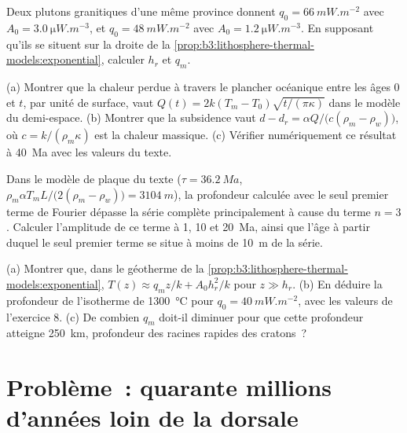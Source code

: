 \begin{exercise}[$\star\star$]\label{exo:b3:lithosphere-thermal-models:9}
Deux plutons granitiques d'une même province donnent $q_0 = \qty{66}{mW.m^{-2}}$ avec $A_0
= \qty{3.0}{\micro W.m^{-3}}$, et $q_0 = \qty{48}{mW.m^{-2}}$ avec $A_0 =
\qty{1.2}{\micro W.m^{-3}}$. En supposant qu'ils se situent sur la droite de la
\cref{prop:b3:lithosphere-thermal-models:exponential}, calculer $h_r$ et $q_m$.
\end{exercise}

\begin{exercise}[$\star\star\star$]\label{exo:b3:lithosphere-thermal-models:10}
(a) Montrer que la chaleur perdue à travers le plancher océanique entre les âges 0 et $t$, par
unité de surface, vaut $Q(t) = 2k(T_m - T_0)\sqrt{t/(\pi\kappa)}$ dans le modèle du
demi-espace. (b) Montrer que la subsidence vaut $d - d_r = \alpha Q/\bigl(c(\rho_m -
\rho_w)\bigr)$, où $c = k/(\rho_m\kappa)$ est la chaleur massique. (c) Vérifier
numériquement ce résultat à \qty{40}{Ma} avec les valeurs du texte.
\end{exercise}

\begin{exercise}[$\star\star\star$]\label{exo:b3:lithosphere-thermal-models:11}
Dans le modèle de plaque du texte ($\tau = \qty{36.2}{Ma}$, $\rho_m\alpha T_mL/
\bigl(2(\rho_m - \rho_w)\bigr) = \qty{3104}{m}$), la profondeur calculée avec le seul
premier terme de Fourier dépasse la série complète principalement à cause du terme $n = 3$.
Calculer l'amplitude de ce terme à 1, 10 et \qty{20}{Ma}, ainsi que l'âge à partir duquel
le seul premier terme se situe à moins de \qty{10}{m} de la série.
\end{exercise}

\begin{exercise}[$\star\star\star$]\label{exo:b3:lithosphere-thermal-models:12}
(a) Montrer que, dans le géotherme de la \cref{prop:b3:lithosphere-thermal-models:exponential},
$T(z) \approx q_mz/k + A_0h_r^2/k$ pour $z \gg h_r$. (b) En déduire la profondeur de
l'isotherme de \qty{1300}{\celsius} pour $q_0 = \qty{40}{mW.m^{-2}}$, avec les valeurs
de l'exercice 8. (c) De combien $q_m$ doit-il diminuer pour que cette profondeur atteigne
\qty{250}{km}, profondeur des racines rapides des cratons~?
\end{exercise}

\section{Problème~: quarante millions d'années loin de la dorsale}

